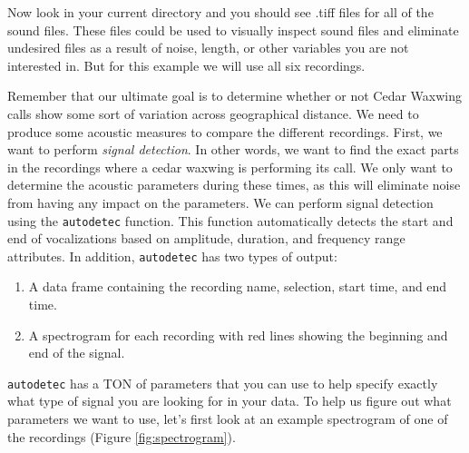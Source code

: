 \documentclass[]{krantz}
\providecommand{\tightlist}{%
  \setlength{\itemsep}{0pt}\setlength{\parskip}{0pt}}
\begin{document}
Now look in your current directory and you should see .tiff files for
all of the sound files. These files could be used to visually inspect
sound files and eliminate undesired files as a result of noise, length,
or other variables you are not interested in. But for this example we
will use all six recordings.

Remember that our ultimate goal is to determine whether or not Cedar
Waxwing calls show some sort of variation across geographical distance.
We need to produce some acoustic measures to compare the different
recordings. First, we want to perform \emph{signal detection}. In other
words, we want to find the exact parts in the recordings where a cedar
waxwing is performing its call. We only want to determine the acoustic
parameters during these times, as this will eliminate noise from having
any impact on the parameters. We can perform signal detection using the
\texttt{autodetec} function. This function automatically detects the
start and end of vocalizations based on amplitude, duration, and
frequency range attributes. In addition, \texttt{autodetec} has two
types of output:

\begin{enumerate}
\def\labelenumi{\arabic{enumi}.}
\tightlist
\item
  A data frame containing the recording name, selection, start time, and
  end time.
\item
  A spectrogram for each recording with red lines showing the beginning
  and end of the signal.
\end{enumerate}

\texttt{autodetec} has a TON of parameters that you can use to help
specify exactly what type of signal you are looking for in your data. To
help us figure out what parameters we want to use, let's first look at
an example spectrogram of one of the recordings (Figure
\ref{fig:spectrogram}).
\end{document}
